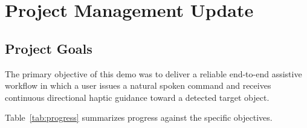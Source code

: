 \documentclass{article}
\begin{document}
 



\begin{abstract} 
HaloAssist is a wearable haptic guidance system intended to provide object-search assistance and spatial awareness for partially sighted users through real-time vibrotactile feedback.

In Demo 3, the system was consolidated into a complete end-to-end pipeline. The implementation replaces discrete motor triggering with continuous offset-based haptic mapping, integrates local offline speech transcription via Vosk~\cite{alphacep_vosk}, introduces lightweight LLM-based noun extraction from natural-language commands~\cite{gerganov2023llama}, and applies YOLO-World~\cite{cheng2024yoloworld} for open-vocabulary target detection.
\end{abstract}

\section{Project Management Update} 

\subsection{Project Goals}

The primary objective of this demo was to deliver a reliable end-to-end assistive workflow in which a user issues a natural spoken command and receives continuous directional haptic guidance toward a detected target object.

Table~\ref{tab:progress} summarizes progress against the specific objectives.
\end{document}
